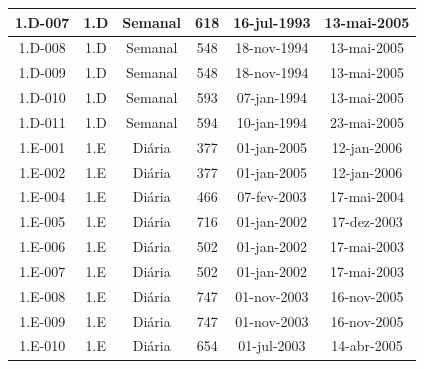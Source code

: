 \begin{center}
\begin{xtabular}{c|c|c|c|c|c}
    {\scriptsize 1.D-007} & {\scriptsize 1.D}   & {\scriptsize Semanal} & {\scriptsize 618 }  & {\scriptsize 16-jul-1993} & {\scriptsize 13-mai-2005} \\ \hline
    {\scriptsize 1.D-008} & {\scriptsize 1.D}   & {\scriptsize Semanal} & {\scriptsize 548 }  & {\scriptsize 18-nov-1994} & {\scriptsize 13-mai-2005} \\ \hline
    {\scriptsize 1.D-009} & {\scriptsize 1.D}   & {\scriptsize Semanal} & {\scriptsize 548 }  & {\scriptsize 18-nov-1994} & {\scriptsize 13-mai-2005} \\ \hline
    {\scriptsize 1.D-010} & {\scriptsize 1.D}   & {\scriptsize Semanal} & {\scriptsize 593 }  & {\scriptsize 07-jan-1994} & {\scriptsize 13-mai-2005} \\ \hline
    {\scriptsize 1.D-011} & {\scriptsize 1.D}   & {\scriptsize Semanal} & {\scriptsize 594 }  & {\scriptsize 10-jan-1994} & {\scriptsize 23-mai-2005} \\ \hline
    {\scriptsize 1.E-001} & {\scriptsize 1.E}   & {\scriptsize Diária} & {\scriptsize 377}   & {\scriptsize 01-jan-2005} & {\scriptsize 12-jan-2006} \\ \hline
    {\scriptsize 1.E-002} & {\scriptsize 1.E}   & {\scriptsize Diária} & {\scriptsize 377}   & {\scriptsize 01-jan-2005} & {\scriptsize 12-jan-2006} \\ \hline
    {\scriptsize 1.E-004} & {\scriptsize 1.E}   & {\scriptsize Diária} & {\scriptsize 466}   & {\scriptsize 07-fev-2003} & {\scriptsize 17-mai-2004} \\ \hline
    {\scriptsize 1.E-005} & {\scriptsize 1.E}   & {\scriptsize Diária} & {\scriptsize 716}   & {\scriptsize 01-jan-2002} & {\scriptsize 17-dez-2003} \\ \hline
    {\scriptsize 1.E-006} & {\scriptsize 1.E}   & {\scriptsize Diária} & {\scriptsize 502}   & {\scriptsize 01-jan-2002} & {\scriptsize 17-mai-2003} \\ \hline
    {\scriptsize 1.E-007} & {\scriptsize 1.E}   & {\scriptsize Diária} & {\scriptsize 502}   & {\scriptsize 01-jan-2002} & {\scriptsize 17-mai-2003} \\ \hline
    {\scriptsize 1.E-008} & {\scriptsize 1.E}   & {\scriptsize Diária} & {\scriptsize 747}   & {\scriptsize 01-nov-2003} & {\scriptsize 16-nov-2005} \\ \hline
    {\scriptsize 1.E-009} & {\scriptsize 1.E}   & {\scriptsize Diária} & {\scriptsize 747}   & {\scriptsize 01-nov-2003} & {\scriptsize 16-nov-2005} \\ \hline
    {\scriptsize 1.E-010} & {\scriptsize 1.E}   & {\scriptsize Diária} & {\scriptsize 654}   & {\scriptsize 01-jul-2003} & {\scriptsize 14-abr-2005} \\ \hline

\end{xtabular}
\end{center}
